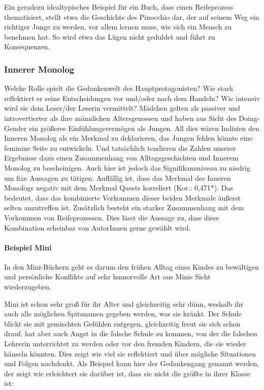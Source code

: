 Ein geradezu idealtypisches Beispiel für ein Buch, dass einen
Reifeprozess thematisiert, stellt etwa die Geschichte des Pinocchio dar,
der auf seinem Weg ein richtiger Junge zu werden, vor allem lernen muss,
wie sich ein Mensch zu benehmen hat. So wird etwa das Lügen nicht
geduldet und führt zu Konsequenzen.

\subsubsection{Innerer Monolog}

Welche Rolle spielt die Gedankenwelt des Hauptprotagonisten? Wie stark
reflektiert er seine Entscheidungen vor und/oder nach dem Handeln? Wie
intensiv wird sie dem Leser/der Leserin vermittelt? Mädchen gelten als
passiver und introvertierter als ihre männlichen Altersgenossen und
haben aus Sicht des Doing-Gender ein größeres Einfühlungsvermögen als
Jungen. All dies wären Indizien den Inneren Monolog als ein Merkmal zu
deklarieren, das Jungen fehlen könnte eine feminine Seite zu entwickeln.
Und tatsächlich tendieren die Zahlen unserer Ergebnisse dazu einen
Zusammenhang von Alltagsgeschichten und Innerem Monolog zu bescheinigen.
Auch hier ist jedoch das Signifikanzniveau zu niedrig um fixe Aussagen
zu tätigen. Auffällig ist, dass das Merkmal des Inneren Monologs negativ
mit dem Merkmal Quests korreliert (Kor.: 0,471*). Das bedeutet, dass das
kombinierte Vorkommen dieser beiden Merkmale äußerst selten anzutreffen
ist. Zusätzlich besteht ein starker Zusammenhang mit dem Vorkommen von
Reifeprozessen. Dies lässt die Aussage zu, dass diese Kombination
scheinbar von AutorInnen gerne gewählt wird.

\paragraph{Beispiel Mini}

In den Mini-Büchern geht es darum den frühen Alltag eines Kindes zu
bewältigen und persönliche Konflikte auf sehr humorvolle Art aus Minis
Sicht wiederzugeben.

Mini ist schon sehr groß für ihr Alter und gleichzeitig sehr dünn,
weshalb ihr auch alle möglichen Spitznamen gegeben werden, was sie
kränkt. Der Schule blickt sie mit gemischten Gefühlen entgegen,
gleichzeitig freut sie sich schon drauf, hat aber auch Angst in die
falsche Schule zu kommen, von der die falschen Lehrerin unterrichtet zu
werden oder vor den fremden Kindern, die sie wieder hänseln könnten.
Dies zeigt wie viel sie reflektiert und über mögliche Situationen und
Folgen nachdenkt. Als Beispiel kann hier der Gedankengang genannt
werden, der zeigt wie erleichtert sie darüber ist, dass sie nicht die
größte in ihrer Klasse ist:

